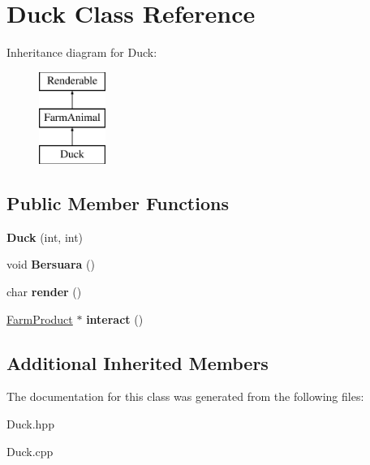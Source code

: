 \hypertarget{class_duck}{}\section{Duck Class Reference}
\label{class_duck}
Inheritance diagram for Duck\+:\begin{figure}[H]
\begin{center}
\leavevmode
\includegraphics[height=3.000000cm]{class_duck}
\end{center}
\end{figure}
\subsection*{Public Member Functions}
\begin{DoxyCompactItemize}
\item 
\mbox{\label{class_duck_aa1c665ec2304c62e280abc629a5f694d}} 
{\bfseries Duck} (int, int)
\item 
\mbox{\label{class_duck_a06cb386d59bbc06f1a565f0503025e2c}} 
void {\bfseries Bersuara} ()
\item 
\mbox{\label{class_duck_aab09de20800285320ab614bafcab392d}} 
char {\bfseries render} ()
\item 
\mbox{\label{class_duck_ae534e13f48f806c1263bc27123af6c0b}} 
\mbox{\hyperlink{class_farm_product}{Farm\+Product}} $\ast$ {\bfseries interact} ()
\end{DoxyCompactItemize}
\subsection*{Additional Inherited Members}


The documentation for this class was generated from the following files\+:\begin{DoxyCompactItemize}
\item 
Duck.\+hpp\item 
Duck.\+cpp\end{DoxyCompactItemize}
